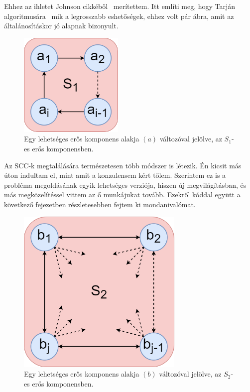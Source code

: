 \documentclass[
]{thesis-ekf}
\theoremstyle{definition}
\theoremstyle{remark}
\begin{document}
	Ehhez az ihletet Johnson cikkéből~\cite{johnson} merítettem. Itt említi meg, hogy Tarján algoritmusára~\cite{tarjan} mik a legrosszabb eshetőségek, ehhez volt pár ábra, amit az általánosításkor jó alapnak bizonyult.

	\begin{figure}[!ht]
		\centering
		\includegraphics[width=5cm]{images/sajat_pelda-altalanos_scck_a}
		\caption{Egy lehetséges erős komponens alakja $(a)$ változóval jelölve, az $ S_1 $-es erős komponensben.}
		\label{abra-sajatpelda-altalanos_scck_a-verzio}
	\end{figure}
	\newpage	
	Az \textsc{SCC}-k megtalálására természetesen több módszer is létezik. Én kicsit más úton indultam el, mint amit a konzulensem kért tőlem. Szerintem ez is a probléma megoldásának egyik lehetséges verziója, hiszen új megvilágításban, és más megközelítéssel vittem az ő munkájukat tovább. Ezekről kóddal együtt a következő fejezetben részletesebben fejtem ki mondanivalómat.
	\begin{figure}[!ht]
		\centering
		\includegraphics[width=8cm]{images/sajat_pelda-altalanos_scck_b2}
		\caption{Egy lehetséges erős komponens alakja $(b)$ változóval jelölve, az $ S_2 $-es erős komponensben.}
		\label{abra-sajatpelda-altalanos_scck_b-verzio}
	\end{figure}
	
\end{document}
